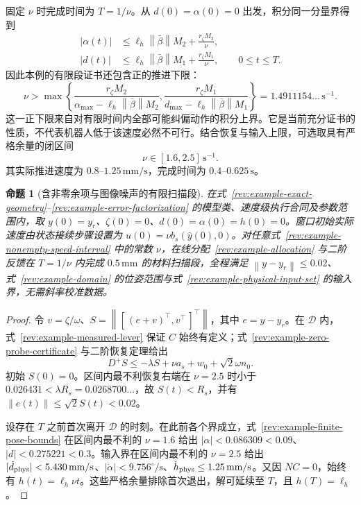 \documentclass[11pt,a4paper]{article}
\numberwithin{equation}{section}
\newtheorem{proposition}[theorem]{命题}
\theoremstyle{definition}
\newcommand{\norm}[1]{\left\lVert#1\right\rVert}
\begin{document}
固定 $\nu$ 时完成时间为 $T=1/\nu$。从 $d(0)=\alpha(0)=0$ 出发，积分同一分量界得到
\begin{align}
 |\alpha(t)|&\le\ell_h\norm{\bar\beta}M_2+\frac{r_\zeta M_2}{\nu},\nonumber\\
 |d(t)|&\le\ell_h\norm{\bar\beta}M_1+\frac{r_\zeta M_1}{\nu},
 \qquad 0\le t\le T.
 \label{rev:example-finite-pose-bounds}
\end{align}
因此本例的有限段证书还包含正的推进下限：
\begin{equation}
 \nu>
 \max\left\{
 \frac{r_\zeta M_2}{\alpha_{\max}-\ell_h\norm{\bar\beta}M_2},
 \frac{r_\zeta M_1}{d_{\max}-\ell_h\norm{\bar\beta}M_1}
 \right\}
 =1.4911154\ldots\,\mathrm{s}^{-1}.
 \label{rev:example-minimum-speed}
\end{equation}
这一正下限来自对有限时间内全部可能纠偏动作的积分上界。它是当前充分证书的性质，不代表机器人低于该速度必然不可行。结合恢复与输入上限，可选取具有严格余量的闭区间
\begin{equation}
 \boxed{\nu\in[1.6,2.5]\,\mathrm{s}^{-1}.}
 \label{rev:example-nonempty-speed-interval}
\end{equation}
其实际推进速度为 $0.8$--$1.25\,\mathrm{mm/s}$，完成时间为 $0.4$--$0.625\,\mathrm{s}$。

\begin{proposition}[含非零余项与图像噪声的有限扫描段]
\label{rev:example-finite-scan-proposition}
在式~\eqref{rev:example-exact-geometry}--\eqref{rev:example-error-factorization} 的模型类、速度级执行合同及参数范围内，取 $y(0)=y_r$、$\zeta(0)=0$、$d(0)=\alpha(0)=h(0)=0$。窗口初始实际速度由状态接续步骤设置为 $u(0)=\nu b_s(\widehat y(0),0)$。对任意式~\eqref{rev:example-nonempty-speed-interval} 中的常数 $\nu$，在线分配~\eqref{rev:example-allocation} 与二阶反馈在 $T=1/\nu$ 内完成 $0.5\,\mathrm{mm}$ 的材料扫描段，全程满足 $\norm{y-y_r}\le0.02$、式~\eqref{rev:example-domain} 的位姿范围与式~\eqref{rev:example-physical-input-set} 的输入界，无需斜率校准数据。
\end{proposition}
\begin{proof}
令 $v=\zeta/\omega$、$S=\norm{[\,(e+v)^\top,v^\top\,]^\top}$，其中 $e=y-y_r$。在 $\mathcal D$ 内，式~\eqref{rev:example-measured-lever} 保证 $C$ 始终有定义；式~\eqref{rev:example-zero-probe-certificate} 与二阶恢复定理给出
\begin{equation}
 D^+S\le-\lambda S+\nu a_s+w_0+\sqrt2\omega n_0.
 \label{rev:example-scalar-envelope}
\end{equation}
初始 $S(0)=0$。区间内最不利恢复右端在 $\nu=2.5$ 时小于
$0.026431<\lambda R_s=0.0268700\ldots$，故 $S(t)<R_s$，并有 $\norm{e(t)}\le\sqrt2S(t)<0.02$。

设存在 $T$ 之前首次离开 $\mathcal D$ 的时刻。在此前各个界成立，式~\eqref{rev:example-finite-pose-bounds} 在区间内最不利的 $\nu=1.6$ 给出
$|\alpha|<0.086309<0.09$、$|d|<0.275221<0.3$。输入界在区间内最不利的 $\nu=2.5$ 给出
$|\dot d_{\rm phys}|<5.430\,\mathrm{mm/s}$、$|\dot\alpha|<9.756^\circ/\mathrm{s}$、$\dot h_{\rm phys}\le1.25\,\mathrm{mm/s}$。又因 $NC=0$，始终有 $h(t)=\ell_h\nu t$。这些严格余量排除首次退出，解可延续至 $T$，且 $h(T)=\ell_h$。
\end{proof}
\end{document}
